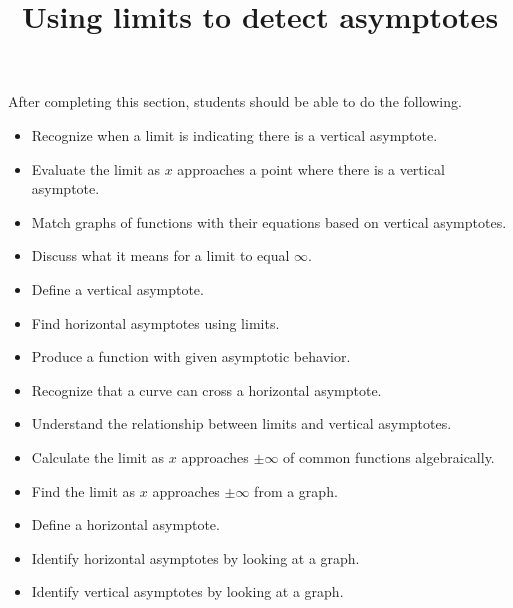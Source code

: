 \documentclass{ximera}
\title{Using limits to detect asymptotes}
\begin{document}
\begin{abstract}
\end{abstract}

\maketitle

\begin{sectionOutcomes}

After completing this section, students should be able to do the following.

\begin{itemize}
\item Recognize when a limit is indicating there is a vertical asymptote.
\item Evaluate the limit as $x$ approaches a point where there is a vertical asymptote.
\item Match graphs of functions with their equations based on vertical asymptotes.
\item Discuss what it means for a limit to equal $\infty$.
\item Define a vertical asymptote.
\item Find horizontal asymptotes using limits.
\item Produce a function with given asymptotic behavior.
\item Recognize that a curve can cross a horizontal asymptote.
\item Understand the relationship between limits and vertical asymptotes.
\item Calculate the limit as $x$ approaches $\pm \infty$ of common functions algebraically.
\item Find the limit as $x$ approaches $\pm \infty$ from a graph.
\item Define a horizontal asymptote.
\item Identify horizontal asymptotes by looking at a graph.
\item Identify vertical asymptotes by looking at a graph.
\end{itemize}
\end{sectionOutcomes}
\end{document}
